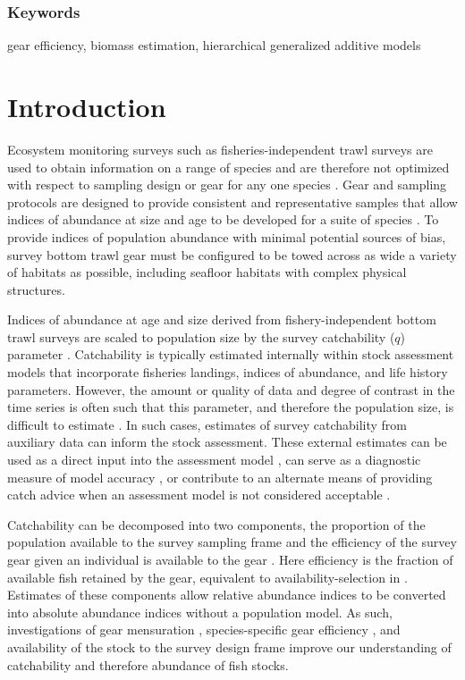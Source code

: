 \documentclass[
  12pt,
]{article}
\begin{document}
\hypertarget{keywords}{%
\subsubsection*{Keywords}\label{keywords}}

gear efficiency, biomass estimation, hierarchical generalized additive
models

\pagebreak

\hypertarget{introduction}{%
\section{Introduction}\label{introduction}}

Ecosystem monitoring surveys such as fisheries-independent trawl surveys
are used to obtain information on a range of species and are therefore
not optimized with respect to sampling design or gear for any one
species \citep{bijleveldetal12, wangetal18}. Gear and sampling protocols
are designed to provide consistent and representative samples that allow
indices of abundance at size and age to be developed for a suite of
species \citep{azarovitz81, thiessetal18}. To provide indices of
population abundance with minimal potential sources of bias, survey
bottom trawl gear must be configured to be towed across as wide a
variety of habitats as possible, including seafloor habitats with
complex physical structures.

Indices of abundance at age and size derived from fishery-independent
bottom trawl surveys are scaled to population size by the survey
catchability (\(q\)) parameter \citep{arreguinsanchez96}. Catchability
is typically estimated internally within stock assessment models that
incorporate fisheries landings, indices of abundance, and life history
parameters. However, the amount or quality of data and degree of
contrast in the time series is often such that this parameter, and
therefore the population size, is difficult to estimate
\citep{maunderpiner15}. In such cases, estimates of survey catchability
from auxiliary data can inform the stock assessment. These external
estimates can be used as a direct input into the assessment model
\citep{somertonetal99}, can serve as a diagnostic measure of model
accuracy \citep{milleretal19}, or contribute to an alternate means of
providing catch advice when an assessment model is not considered
acceptable \citep{legaultmccurdy17}.

Catchability can be decomposed into two components, the proportion of
the population available to the survey sampling frame and the efficiency
of the survey gear given an individual is available to the gear
\citep{paloheimodickie64}. Here efficiency is the fraction of available
fish retained by the gear, equivalent to availability-selection in
\citet{millarfryer99}. Estimates of these components allow relative
abundance indices to be converted into absolute abundance indices
without a population model. As such, investigations of gear mensuration
\citep{kotwickietal11}, species-specific gear efficiency
\citep{thygesenetal19}, and availability of the stock to the survey
design frame \citep{nicholetal19} improve our understanding of
catchability and therefore abundance of fish stocks.
\end{document}
